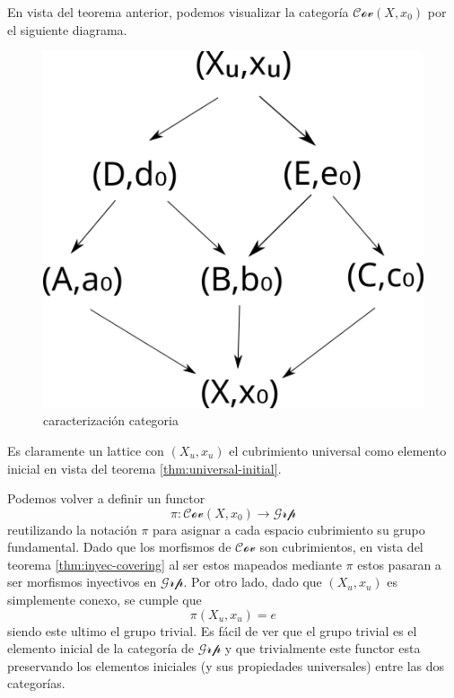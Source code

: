 En vista del teorema anterior, podemos visualizar la categoría
\(\mathscr{Cov} (X, x_0)\) por el siguiente diagrama.
\begin{figure}[h]
  \centering
  \includegraphics[scale=0.3]{./imagenes/cov.png}
  \caption{caracterización categoria}
\end{figure}
Es claramente un lattice con \((X_u, x_u)\) el cubrimiento universal
como elemento inicial en vista del teorema \ref{thm:universal-initial}.

Podemos volver a definir un functor
\[ \pi : \mathscr{Cov} (X, x_0) \to \mathscr{Grp} \]
reutilizando la notación \(\pi\) para asignar a cada espacio cubrimiento
su grupo fundamental. Dado que los morfismos de \(\mathscr{Cov}\) son
cubrimientos, en vista del teorema \ref{thm:inyec-covering} al ser estos
mapeados mediante \(\pi\) estos pasaran a ser morfismos inyectivos en
\(\mathscr{Grp}\). Por otro lado, dado que \((X_u, x_u)\) es simplemente
conexo, se cumple que
\[ \pi (X_u, x_u) = {e} \]
siendo este ultimo el grupo trivial. Es fácil de ver que el grupo
trivial es el elemento inicial de la categoría de \(\mathscr{Grp}\) y
que trivialmente este functor esta preservando los elementos iniciales
(y sus propiedades universales) entre las dos categorías.